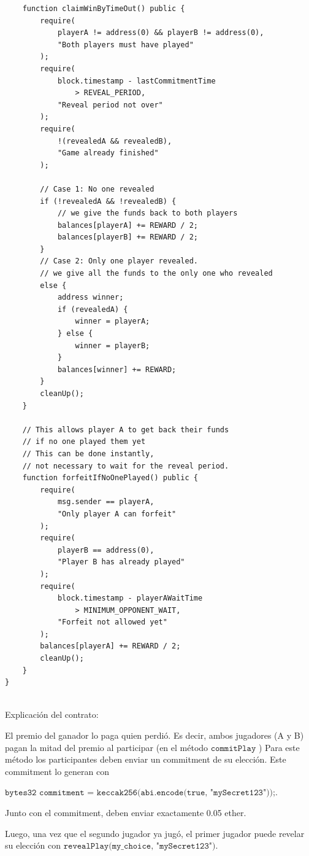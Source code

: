 \documentclass[12pt,addpoints,answers]{exam}
\begin{document}
\begin{questions}
\begin{parts}
\begin{solution}
\begin{verbatim}
    function claimWinByTimeOut() public {
        require(
            playerA != address(0) && playerB != address(0),
            "Both players must have played"
        );
        require(
            block.timestamp - lastCommitmentTime
                > REVEAL_PERIOD,
            "Reveal period not over"
        );
        require(
            !(revealedA && revealedB),
            "Game already finished"
        );

        // Case 1: No one revealed
        if (!revealedA && !revealedB) {
            // we give the funds back to both players
            balances[playerA] += REWARD / 2;
            balances[playerB] += REWARD / 2;
        }
        // Case 2: Only one player revealed.
        // we give all the funds to the only one who revealed
        else {
            address winner;
            if (revealedA) {
                winner = playerA;
            } else {
                winner = playerB;
            }
            balances[winner] += REWARD;
        }
        cleanUp();
    }

    // This allows player A to get back their funds 
    // if no one played them yet
    // This can be done instantly, 
    // not necessary to wait for the reveal period.
    function forfeitIfNoOnePlayed() public {
        require(
            msg.sender == playerA,
            "Only player A can forfeit"
        );
        require(
            playerB == address(0),
            "Player B has already played"
        );
        require(
            block.timestamp - playerAWaitTime
                > MINIMUM_OPPONENT_WAIT,
            "Forfeit not allowed yet"
        );
        balances[playerA] += REWARD / 2;
        cleanUp();
    }
}


  \end{verbatim}
  
  Explicación del contrato:

  El premio del ganador lo paga quien perdió. Es decir, ambos jugadores (A y B) pagan la mitad del premio al participar (en el método $\texttt{commitPlay}$ )
  Para este método los participantes deben enviar un commitment de su elección. Este commitment lo generan con 
  
  $\texttt{bytes32 commitment = keccak256(abi.encode(true, "mySecret123"));}$.

  Junto con el commitment, deben enviar exactamente 0.05 ether.

  Luego, una vez que el segundo jugador ya jugó, el primer jugador puede revelar su elección con $\texttt{revealPlay(my\_choice, "mySecret123")}$.


\end{solution}
\end{parts}
\end{questions}
\end{document}
